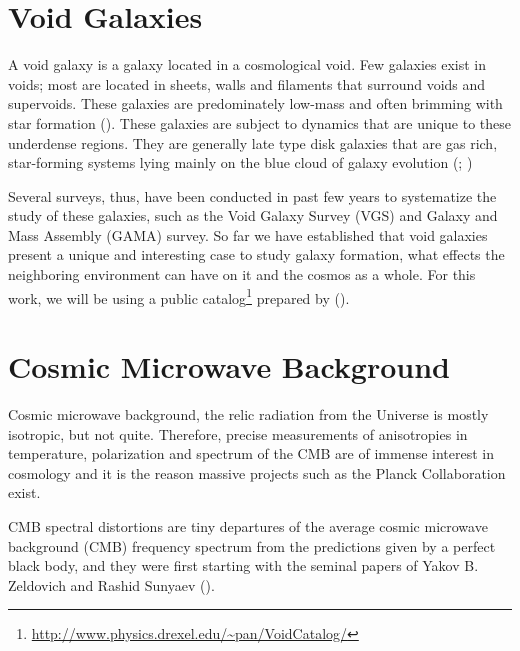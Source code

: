 \section{Void Galaxies}
A void galaxy is a galaxy located in a cosmological void. Few galaxies exist in voids; most are located in sheets, walls and filaments that surround voids and supervoids. These galaxies are predominately low-mass and often brimming with star formation (\cite{singari_detection_2018}). These galaxies are subject to dynamics that are unique to these underdense regions. They are generally late type disk galaxies that are gas rich, star-forming systems lying mainly on the blue cloud of galaxy evolution (\cite{beygu_void_2017}; \cite{kreckel_only_2011})
\par
Several surveys, thus, have been conducted in past few years to systematize the study of these galaxies, such as the Void Galaxy Survey (VGS) and Galaxy and Mass Assembly (GAMA) survey. So far we have established that void galaxies present a unique and interesting case to study galaxy formation, what effects the neighboring environment can have on it and the cosmos as a whole. For this work, we will be using a public catalog\footnote{\url{http://www.physics.drexel.edu/~pan/VoidCatalog/}} prepared by \citeauthor{pan_cosmic_2012} (\cite*{pan_cosmic_2012}).
\section{Cosmic Microwave Background}
Cosmic microwave background, the relic radiation from the Universe is mostly isotropic, but not quite. Therefore, precise measurements of anisotropies in temperature, polarization and spectrum of the CMB are of immense interest in cosmology and it is the reason massive projects such as the Planck Collaboration exist.
\par 
CMB spectral distortions are tiny departures of the average cosmic microwave background (CMB) frequency spectrum from the predictions given by a perfect black body, and they were first starting with the seminal papers of Yakov B. Zeldovich and Rashid Sunyaev (\cite{sunyaev_small-scale_1970}).
